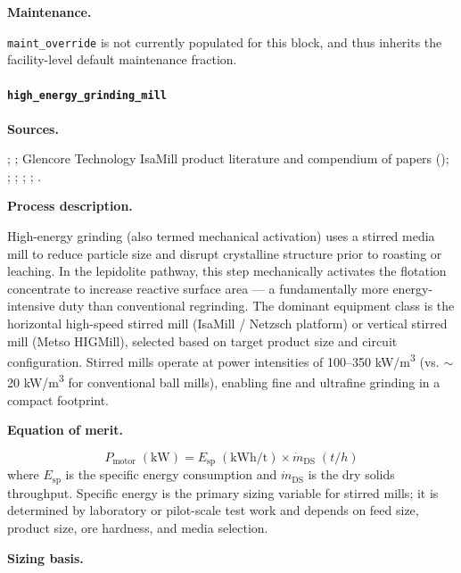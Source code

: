 \medskip
\noindent\textbf{Maintenance.}\quad

\texttt{maint\_override} is not currently populated for this block, and thus inherits the facility-level default maintenance fraction.


\clearpage
\paragraph{\texttt{high\_energy\_grinding\_mill}}\label{app:04-methods-blockdefs-hegm}

\medskip
\noindent\textbf{Sources.}\quad

\citet{debakkerEnergyUseFine2014}; \citet{brissetteEnergySavingsTechnology2010}; Glencore Technology IsaMill product literature and compendium of papers (\citet{glencoretechnologyIsaMill2020Compendium2020}); \citet{kumarEnergyEfficientAdvancedUltrafine2023}; \citet{nanMethodsExtractingLithium2019}; \citet{nanMethodsExtractingLithium2022}; \citet{zouMethodEfficientLithium2024}; 
\citet{ulrichGuideChemicalEngineering1984}.

\medskip
\noindent\textbf{Process description.}\quad

High-energy grinding (also termed mechanical activation) uses a stirred media mill to reduce particle size and disrupt crystalline structure prior to roasting or leaching. In the lepidolite pathway, this step mechanically activates the flotation concentrate to increase reactive surface area --- a fundamentally more energy-intensive duty than conventional regrinding. The dominant equipment class is the horizontal high-speed stirred mill (IsaMill / Netzsch platform) or vertical stirred mill (Metso HIGMill), selected based on target product size and circuit configuration. Stirred mills operate at power intensities of 100--350 \si{kW/m^3} (vs. $\sim$20 \si{kW/m^3} for conventional ball mills), enabling fine and ultrafine grinding in a compact footprint.


\medskip
\noindent\textbf{Equation of merit.}\quad

\[
	P_{\text{motor}}\;(\text{kW}) = E_{\text{sp}}\;(\text{kWh/t}) \times \dot{m}_{\text{DS}}\;(\si{t/h})
\]
where $E_{\text{sp}}$ is the specific energy consumption and $\dot{m}_{\text{DS}}$ is the dry solids throughput. Specific energy is the primary sizing variable for stirred mills; it is determined by laboratory or pilot-scale test work and depends on feed size, product size, ore hardness, and media selection.


\medskip
\noindent\textbf{Sizing basis.}\quad

